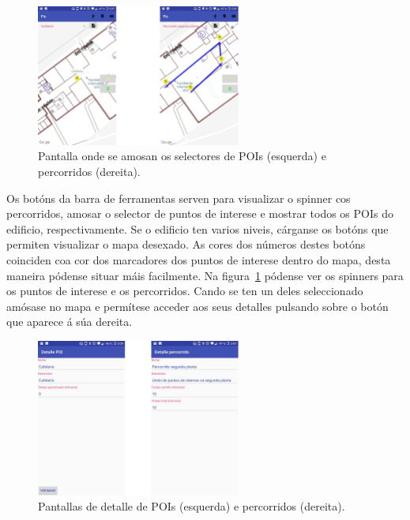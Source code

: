 \begin{figure}[h]
	\begin{center}
		\includegraphics[width=0.6\textwidth]{figures/android/mapaSelector}
		\caption{Pantalla onde se amosan os selectores de POIs (esquerda) e percorridos (dereita).}
		\label{fig:mapaSelector}
	\end{center}
\end{figure}

Os botóns da barra de ferramentas serven para visualizar o spinner cos percorridos, amosar o selector de puntos de interese e mostrar todos os POIs do edificio, respectivamente. Se o edificio ten varios niveis, cárganse os botóns que permiten visualizar o mapa desexado. As cores dos números destes botóns coinciden coa cor dos marcadores dos puntos de interese dentro do mapa, desta maneira pódense situar máis facilmente. Na figura~\ref{fig:mapaSelector} pódense ver os spinners para os puntos de interese e os percorridos. Cando se ten un deles seleccionado amósase no mapa e permítese acceder aos seus detalles pulsando sobre o botón que aparece á súa dereita.

\begin{figure}[h]
	\begin{center}
		\includegraphics[width=0.6\textwidth]{figures/android/detallePoiPercorrido}
		\caption{Pantallas de detalle de POIs (esquerda) e percorridos (dereita).}
		\label{fig:detallePoiPercorrido}
	\end{center}
\end{figure}

